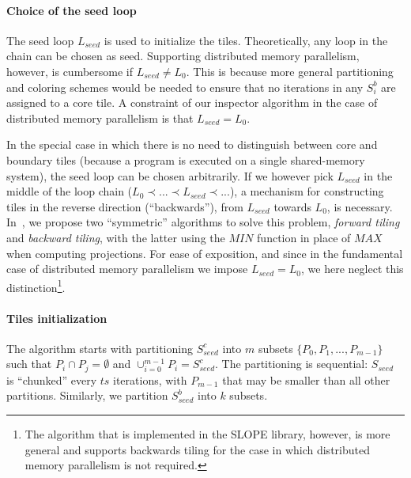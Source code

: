 \paragraph{Choice of the seed loop}
The seed loop $L_{seed}$ is used to initialize the tiles. Theoretically, any loop in the chain can be chosen as seed. Supporting distributed memory parallelism, however, is cumbersome if $L_{seed} \neq L_0$. This is because more general partitioning and coloring schemes would be needed to ensure that no iterations in any $S_i^{b}$ are assigned to a core tile. A constraint of our inspector algorithm in the case of distributed memory parallelism is that $L_{seed} = L_0$. 

In the special case in which there is no need to distinguish between core and boundary tiles (because a program is executed on a single shared-memory system), the seed loop can be chosen arbitrarily. If we however pick $L_{seed}$ in the middle of the loop chain ($L_0 \prec ... \prec L_{seed} \prec ...$), a mechanism for constructing tiles in the reverse direction (``backwards''), from $L_{seed}$ towards $L_0$, is necessary. In~\cite{st-paper}, we propose two ``symmetric'' algorithms to solve this problem, \textit{forward tiling} and \textit{backward tiling}, with the latter using the $MIN$ function in place of $MAX$ when computing projections. For ease of exposition, and since in the fundamental case of distributed memory parallelism we impose $L_{seed} = L_0$, we here neglect this distinction\footnote{The algorithm that is implemented in the SLOPE library, however, is more general and supports backwards tiling for the case in which distributed memory parallelism is not required.}. 


\paragraph{Tiles initialization}
The algorithm starts with partitioning $S_{seed}^{c}$ into $m$ subsets $\lbrace P_0, P_1, ..., P_{m-1}\rbrace$ such that $P_i \cap P_j = \emptyset$ and $\cup_{i = 0}^{m-1} P_i = S_{seed}^{c}$. The partitioning is sequential: $S_{seed}$ is ``chunked'' every $ts$ iterations, with $P_{m-1}$ that may be smaller than all other partitions. Similarly, we partition $S_{seed}^{b}$ into $k$ subsets.

